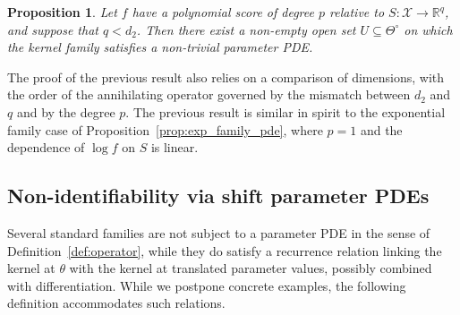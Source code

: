 \documentclass[11pt,twoside]{article} %
\newtheorem{proposition}{Proposition}
\begin{document}
\begin{proposition}\label{prop:general_pde}
Let $f$ have a polynomial score of degree $p$ relative to $S:\mathcal X\to\mathbb R^q$, and suppose that $q<d_2$. Then there exist a non-empty open set $U\subseteq\Theta^\circ$ on which the kernel family satisfies a non-trivial parameter PDE.
\end{proposition}

The proof of the previous result also relies on a comparison of dimensions, with the order of the annihilating operator governed by the mismatch between $d_2$ and $q$ and by the degree $p$. The previous result is similar in spirit to the exponential family case of Proposition~\ref{prop:exp_family_pde}, where $p=1$ and the dependence of $\log f$ on $S$ is linear.



\subsection{Non-identifiability via shift parameter PDEs}\label{sec:shift}

Several standard families are not subject to a parameter PDE in the sense of Definition~\ref{def:operator}, while they do satisfy a recurrence relation linking the kernel at $\theta$ with the kernel at translated parameter values, possibly combined with differentiation. While we postpone concrete examples, the following definition accommodates such relations.
\end{document}
